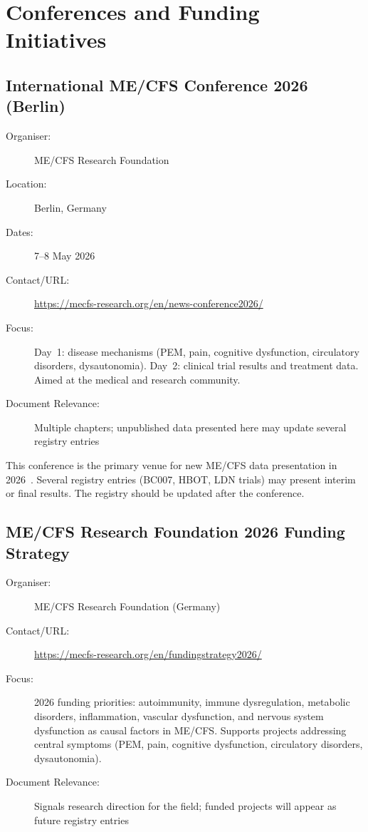 \section{Conferences and Funding Initiatives}
\label{sec:registry-conferences}

\subsection{International ME/CFS Conference 2026 (Berlin)}
\label{sec:registry-berlin-2026}

\begin{description}
    \item[Organiser:] ME/CFS Research Foundation
    \item[Location:] Berlin, Germany
    \item[Dates:] 7--8 May 2026
    \item[Contact/URL:] \url{https://mecfs-research.org/en/news-conference2026/}
    \item[Focus:] Day~1: disease mechanisms (PEM, pain, cognitive dysfunction,
        circulatory disorders, dysautonomia).  Day~2: clinical trial results
        and treatment data.  Aimed at the medical and research community.
    \item[Document Relevance:] Multiple chapters; unpublished data presented
        here may update several registry entries
\end{description}

This conference is the primary venue for new ME/CFS data presentation in
2026~\cite{BerlinConference2026}.  Several registry entries (BC007, HBOT,
LDN trials) may present interim or final results.  The registry should be
updated after the conference.

\subsection{ME/CFS Research Foundation 2026 Funding Strategy}
\label{sec:registry-mecfs-foundation-2026}

\begin{description}
    \item[Organiser:] ME/CFS Research Foundation (Germany)
    \item[Contact/URL:] \url{https://mecfs-research.org/en/fundingstrategy2026/}
    \item[Focus:] 2026 funding priorities: autoimmunity, immune
        dysregulation, metabolic disorders, inflammation, vascular
        dysfunction, and nervous system dysfunction as causal factors in
        ME/CFS.  Supports projects addressing central symptoms (PEM, pain,
        cognitive dysfunction, circulatory disorders, dysautonomia).
    \item[Document Relevance:] Signals research direction for the field;
        funded projects will appear as future registry entries
\end{description}

